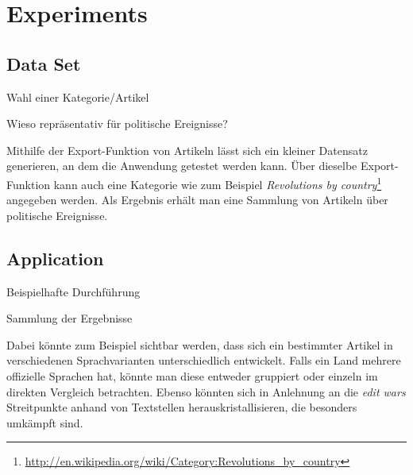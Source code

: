 \chapter{Experiments}\label{ch:experiment}

\section{Data Set}

\begin{todos}
    \item Wahl einer Kategorie/Artikel
    \item Wieso repräsentativ für politische Ereignisse?
\end{todos}

Mithilfe der Export-Funktion von Artikeln lässt sich ein kleiner Datensatz generieren, an dem die Anwendung getestet werden kann.
Über dieselbe Export-Funktion kann auch eine Kategorie wie zum Beispiel \emph{Revolutions by country}\footnote{\url{http://en.wikipedia.org/wiki/Category:Revolutions_by_country}} angegeben werden. 
Als Ergebnis erhält man eine Sammlung von Artikeln über politische Ereignisse.


\section{Application}

\begin{todos}
    \item Beispielhafte Durchführung
    \item Sammlung der Ergebnisse
\end{todos}

Dabei könnte zum Beispiel sichtbar werden, dass sich ein bestimmter Artikel in verschiedenen Sprachvarianten unterschiedlich entwickelt. 
Falls ein Land mehrere offizielle Sprachen hat, könnte man diese entweder gruppiert oder einzeln im direkten Vergleich betrachten.
Ebenso könnten sich in Anlehnung an die \emph{edit wars} Streitpunkte anhand von Textstellen herauskristallisieren, die besonders umkämpft sind. 

